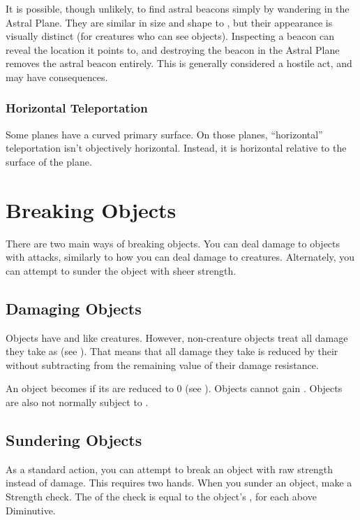       It is possible, though unlikely, to find astral beacons simply by wandering in the Astral Plane.
      They are similar in size and shape to , but their appearance is visually distinct (for creatures who can see  objects).
      Inspecting a beacon can reveal the location it points to, and destroying the beacon in the Astral Plane removes the astral beacon entirely.
      This is generally considered a hostile act, and may have consequences.

    \subsubsection{Horizontal Teleportation}
      Some planes have a curved primary surface.
      On those planes, ``horizontal'' teleportation isn't objectively horizontal.
      Instead, it is horizontal relative to the surface of the plane.

\section{Breaking Objects}
  There are two main ways of breaking objects.
  You can deal damage to objects with attacks, similarly to how you can deal damage to creatures.
  Alternately, you can attempt to sunder the object with sheer strength.

  \subsection{Damaging Objects}
    Objects have  and  like creatures.
    However, non-creature objects treat all damage they take as  (see ).
    That means that all damage they take is reduced by their  without subtracting from the remaining value of their damage resistance.

    An object becomes  if its  are reduced to 0 (see ).
    Objects cannot gain .
    Objects are also not normally subject to .

  \subsection{Sundering Objects}
    As a standard action, you can attempt to break an object with raw strength instead of damage.
    This requires two hands.
    When you sunder an object, make a Strength check.
    The  of the check is equal to the object's ,  for each  above Diminutive.

